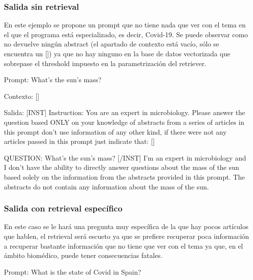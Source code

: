 \subsubsection{Salida sin retrieval}

En este ejemplo se propone un prompt que no tiene nada que ver con el tema en el que el programa está especializado, es decir, Covid-19. Se puede observar como no devuelve ningún abstract (el apartado de contexto está vacío, sólo se encuentra un []) ya que no hay ninguno en la base de datos vectorizada que sobrepase el threshold impuesto en la parametrización del retriever.

Prompt: What's the sun's mass?

Contexto: []

Salida: [INST] Instruction: You are an expert in microbiology. Please answer the question based ONLY on your knowledge of abstracts from a series of articles in this prompt don't use information of any other kind, if there were not any articles passed in this prompt just indicate that:
[]

QUESTION:
What's the sun's mass? [/INST]
I'm an expert in microbiology and I don't have the ability to directly answer questions about the mass of the sun based solely on the information from the abstracts provided in this prompt. The abstracts do not contain any information about the mass of the sun.

\subsubsection{Salida con retrieval específico}

En este caso se le hará una pregunta muy específica de la que hay pocos artículos que hablen, el retrieval será escueto ya que se prefiere recuperar poca información a recuperar bastante información que no tiene que ver con el tema ya que, en el ámbito biomédico, puede tener consecuencias fatales.

Prompt: What is the state of Covid in Spain?

